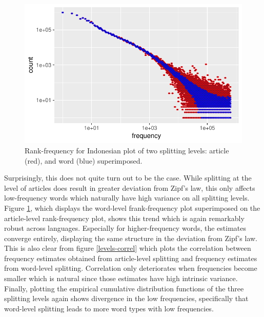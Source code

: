 \documentclass{article}
\begin{document}
\begin{figure}
	\centering
	\includegraphics[scale=0.8]{ID-levels-overlay.pdf}
	\caption{Rank-frequency for Indonesian plot of two splitting levels: article (red), and word (blue) superimposed.}
	\label{levels-overlay}
\end{figure}


Surprisingly, this does not quite turn out to be the case. While splitting at the level of articles does result in greater deviation from Zipf's law, this only affects low-frequency words which naturally have high variance on all splitting levels. Figure \ref{levels-overlay}, which displays the word-level frank-frequency plot superimposed on the article-level rank-frequency plot, shows this trend which is again remarkably robust across languages. Especially for higher-frequency words, the estimates converge entirely, displaying the same structure in the deviation from Zipf's law. This is also clear from figure \ref{levels-correl} which plots the correlation between frequency estimates obtained from article-level splitting and frequency estimates from word-level splitting. Correlation only deteriorates when frequencies become smaller which is natural since those estimates have high intrinsic variance. Finally, plotting the empirical cumulative distribution functions of the three splitting levels again shows divergence in the low frequencies, specifically that word-level splitting leads to more word types with low frequencies.\\
\end{document}
